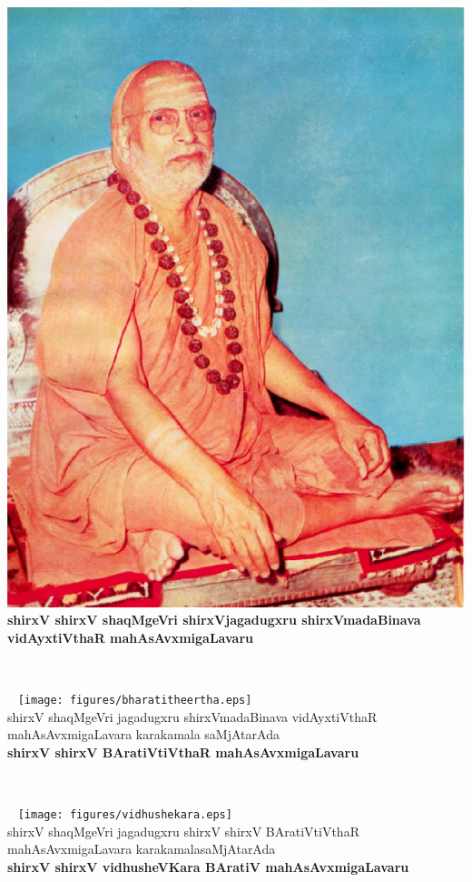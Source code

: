 \begin{center}
~
\vfill
\thispagestyle{empty}
\includegraphics{figures/abhinava_v_t.eps}\\
{\bf shirxV shirxV shaqMgeVri shirxVjagadugxru shirxVmadaBinava\\ vidAyxtiVthaR mahAsAvxmigaLavaru}
\vfill
\end{center}
\newpage
~\thispagestyle{empty}
\newpage
\begin{center}
~
\vfill
\thispagestyle{empty}
\texttt{[image: figures/bharatitheertha.eps]}\\
shirxV shaqMgeVri jagadugxru  shirxVmadaBinava vidAyxtiVthaR\\ mahAsAvxmigaLavara karakamala saMjAtarAda\\ 
{\bf shirxV shirxV BAratiVtiVthaR mahAsAvxmigaLavaru}
\vfill
\end{center}
\newpage
~\thispagestyle{empty}
\newpage
\begin{center}
~
\vfill
\thispagestyle{empty}
\texttt{[image: figures/vidhushekara.eps]}\\
shirxV shaqMgeVri jagadugxru shirxV shirxV BAratiVtiVthaR\\ mahAsAvxmigaLavara karakamalasaMjAtarAda\\ 
{\bf shirxV shirxV vidhusheVKara BAratiV mahAsAvxmigaLavaru}
\vfill
\end{center}

